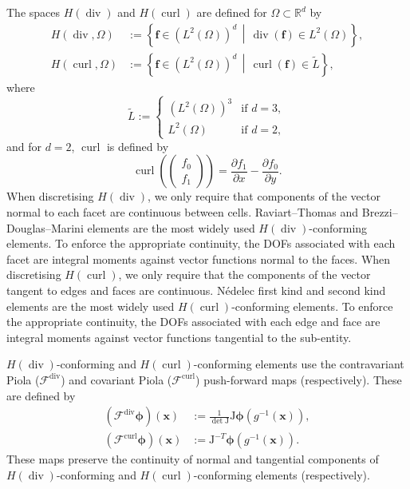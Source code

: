 \documentclass[sn-mathphys-num]{sn-jnl}%
\theoremstyle{thmstyleone}%
\newcommand{\mat}[1]{\boldsymbol{\mathrm{#1}}}
\renewcommand{\vec}[1]{\boldsymbol{#1}}
\newcommand{\scurl}{\operatorname{curl}}
\newcommand{\sdiv}{\operatorname{div}}
\newcommand{\vcurl}{\scurl}
\newcommand{\mapping}{\mathcal{F}}
\newcommand{\geometrymap}{g}
\newcommand{\jacobian}{\mat{J}}
\newcommand{\invtranspose}{^{-T}}
\newcommand{\inv}{^{-1}}
\theoremstyle{thmstyletwo}%
\theoremstyle{thmstylethree}%
\begin{document}
The spaces $H(\sdiv)$ and $H(\vcurl)$
\cite[chapter 4]{ern-guermond}
are defined for $\Omega\subset\mathbb{R}^d$ by
\begin{align*}
H(\sdiv, \Omega) &:=\left\{\vec{f}\in \left(L^2(\Omega)\right)^d\,\middle|\,\sdiv(\vec{f})\in L^2(\Omega)\right\},\\
H(\scurl, \Omega) &:=\left\{\vec{f}\in \left(L^2(\Omega)\right)^d\,\middle|\,\scurl(\vec{f})\in\tilde{L}\right\},
\end{align*}
where $$\tilde{L}:=\begin{cases}\left(L^2(\Omega)\right)^3&\text{if }d=3,\\L^2(\Omega)&\text{if }d=2,\end{cases}$$
and for $d=2$, $\scurl$ is defined by
$$\scurl\left(\begin{pmatrix}f_0\\f_1\end{pmatrix}\right)
=
\frac{\partial f_1}{\partial x} -\frac{\partial f_0}{\partial y}.$$
When discretising $H(\sdiv)$, we only require that components of the vector
normal to each facet are continuous between cells.
Raviart--Thomas \cite{rt}
and Brezzi--Douglas--Marini \cite{bdm} elements are the most widely used $H(\sdiv)$-conforming elements. To enforce
the appropriate continuity, the DOFs associated with each facet are integral moments against vector functions
normal to the faces.
When discretising $H(\vcurl)$, we only require that the components of the vector
tangent to edges and faces are continuous.
N\'edelec first kind \cite{nedelec1} and second kind \cite{nedelec2} elements
are the most widely used $H(\vcurl)$-conforming elements. To enforce the appropriate continuity, the DOFs associated with each
edge and face are integral moments against vector functions tangential to the sub-entity.

$H(\sdiv)$-conforming and $H(\vcurl)$-conforming elements
use the contravariant Piola ($\mapping^{\sdiv}$) and covariant Piola ($\mapping^{\vcurl}$) push-forward
maps (respectively). These are defined by
\begin{align*}
\left(\mapping^{\sdiv}\vec{\phi}\right)(\vec{x})
&:=\frac1{\det\jacobian}\jacobian\vec{\phi}(\geometrymap\inv(\vec{x})),\\
\left(\mapping^{\vcurl}\vec{\phi}\right)(\vec{x})
&:=\jacobian\invtranspose\vec{\phi}(\geometrymap\inv(\vec{x})).
\end{align*}
These maps preserve the continuity of normal and tangential components of $H(\sdiv)$-conforming and
$H(\vcurl)$-conforming elements (respectively).
\end{document}

